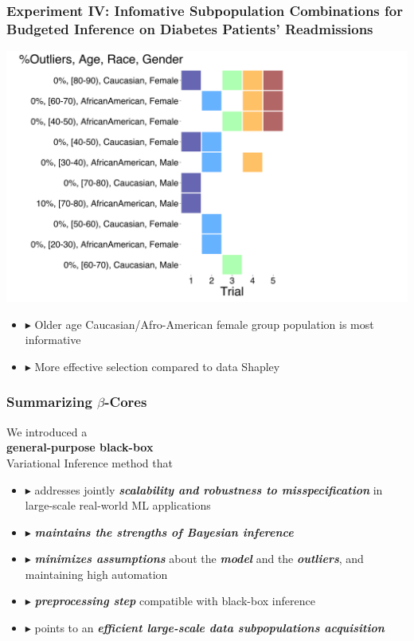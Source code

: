 \documentclass[hyperref={colorlinks = true},unknownkeysallowed]{beamer}
\let\oldcitep=\citep
\renewcommand\citep[1]{\hypersetup{linkcolor=darkred}\hyperlink{#1}{\oldcitep{#1}}}
\begin{document}
\begin{frame}
	\frametitle{Experiment IV: Infomative Subpopulation Combinations for Budgeted Inference on Diabetes Patients' Readmissions}
	\centering
	\includegraphics[width=.58\textwidth]{figs/selected_groups.png}	
	\begin{itemize}
		\item $\blacktriangleright$ Older age Caucasian/Afro-American female group population is most informative ~\citep{ghorbani19}
		\item $\blacktriangleright$ More effective selection compared to data Shapley~\citep{shapley53}
	\end{itemize}
\end{frame}


\begin{frame}
	\frametitle{Summarizing $\beta$-Cores}
	\centering
	We introduced a \\ \textbf{general-purpose  black-box} \\ Variational Inference method that \pause
	\begin{itemize}
		\item $\blacktriangleright$ addresses jointly \emph{\textbf{scalability and robustness to misspecification}} in  large-scale real-world ML applications
		\item $\blacktriangleright$ \emph{\textbf{maintains the strengths of Bayesian inference}}
		\item $\blacktriangleright$ \emph{\textbf{minimizes assumptions}} about the \emph{\textbf{model}} and the \emph{\textbf{outliers}}, and maintaining high automation
		\item $\blacktriangleright$ \emph{\textbf{preprocessing step}} compatible with black-box inference
		\item $\blacktriangleright$ points to an \emph{\textbf{efficient large-scale data subpopulations acquisition}}
	\end{itemize}
\end{frame}
\end{document}
